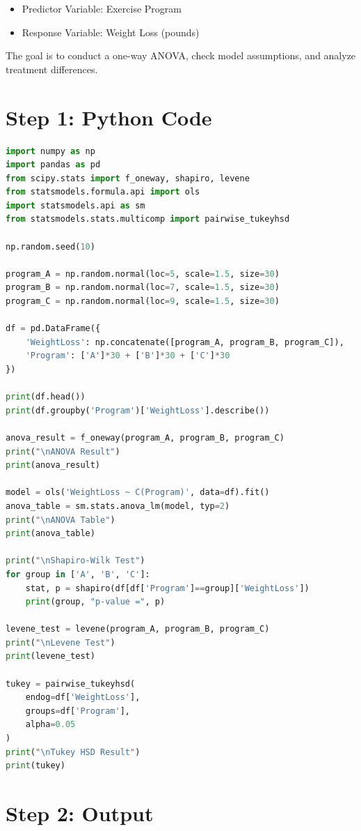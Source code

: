 \documentclass[12pt]{article}
\begin{document}
\begin{itemize}
    \item Predictor Variable: Exercise Program
    \item Response Variable: Weight Loss (pounds)
\end{itemize}

The goal is to conduct a one-way ANOVA, check model assumptions, and analyze treatment differences.

\section*{Step 1: Python Code}

\begin{lstlisting}[language=Python]
import numpy as np
import pandas as pd
from scipy.stats import f_oneway, shapiro, levene
from statsmodels.formula.api import ols
import statsmodels.api as sm
from statsmodels.stats.multicomp import pairwise_tukeyhsd

np.random.seed(10)

program_A = np.random.normal(loc=5, scale=1.5, size=30)
program_B = np.random.normal(loc=7, scale=1.5, size=30)
program_C = np.random.normal(loc=9, scale=1.5, size=30)

df = pd.DataFrame({
    'WeightLoss': np.concatenate([program_A, program_B, program_C]),
    'Program': ['A']*30 + ['B']*30 + ['C']*30
})

print(df.head())
print(df.groupby('Program')['WeightLoss'].describe())

anova_result = f_oneway(program_A, program_B, program_C)
print("\nANOVA Result")
print(anova_result)

model = ols('WeightLoss ~ C(Program)', data=df).fit()
anova_table = sm.stats.anova_lm(model, typ=2)
print("\nANOVA Table")
print(anova_table)

print("\nShapiro-Wilk Test")
for group in ['A', 'B', 'C']:
    stat, p = shapiro(df[df['Program']==group]['WeightLoss'])
    print(group, "p-value =", p)

levene_test = levene(program_A, program_B, program_C)
print("\nLevene Test")
print(levene_test)

tukey = pairwise_tukeyhsd(
    endog=df['WeightLoss'],
    groups=df['Program'],
    alpha=0.05
)
print("\nTukey HSD Result")
print(tukey)
\end{lstlisting}

\section*{Step 2: Output}
\end{document}

